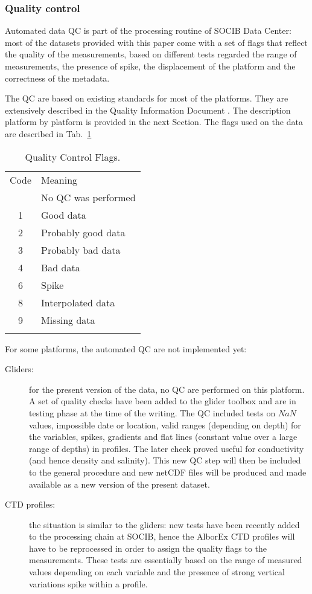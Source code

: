 \documentclass[essd,manuscript]{copernicus}
\begin{document}
\subsubsection{Quality control}

Automated data QC is part of the processing routine of SOCIB Data Center: most of the datasets provided with this paper come with a set of flags that reflect the quality of the measurements, based on different tests regarded the range of measurements, the presence of spike, the displacement of the platform and the correctness of the metadata. 

The QC are based on existing standards for most of the platforms. They are extensively described in the Quality Information Document \citep{SOCIBQC2018}. The description platform by platform is provided in the next Section. The flags used on the data are described in Tab.~\ref{tab:qc}

\begin{table}[htpb]
\caption{Quality Control Flags.\label{tab:qc}}
\begin{tabular}{cl}
\tophline
Code		&  Meaning  			\\
\middlehline
0			&  No QC was performed	\\
1			&  Good data 			\\
2			&  Probably good data	\\
3			&  Probably bad data	\\
4			&  Bad data				\\
6			&  Spike				\\
8			&  Interpolated data	\\
9			&  Missing data			\\
\bottomhline
\end{tabular}
\belowtable{} %
\end{table}

For some platforms, the automated QC are not implemented yet:
\begin{description}
\item[Gliders:] for the present version of the data, no QC are performed on this platform. A set of quality checks have been added to the glider toolbox \citep[][and available at \url{https://github.com/socib/glider_toolbox}]{TROUPIN16} and are in testing phase at the time of the writing. The QC included tests on $NaN$ values, impossible date or location, valid ranges (depending on depth) for the variables, spikes, gradients and flat lines (constant value over a large range of depths) in profiles. The later check proved useful for conductivity (and hence density and salinity). This new QC step will then be included to the general procedure and new netCDF files will be produced and made available as a new version of the present dataset.
\item[CTD profiles:] the situation is similar to the gliders: new tests have been recently added to the processing chain at SOCIB, hence the AlborEx CTD profiles will have to be reprocessed in order to assign the quality flags to the measurements. These tests are essentially based on the range of measured values depending on each variable and the presence of strong vertical variations spike within a profile.
\end{description}
\end{document}
